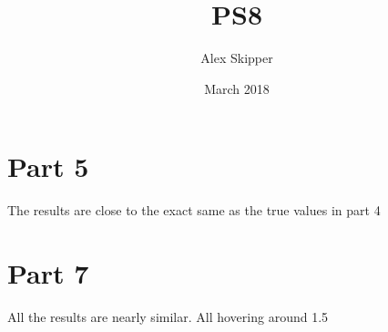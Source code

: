 \documentclass{article}
\title{PS8}
\author{Alex Skipper }
\date{March 2018}
\begin{document}
\maketitle

\section{Part 5}
The results are close to the exact same as the true values in part 4 

\begin{table}[!htbp] \centering 
  \caption{} 
  \label{} 
\end{table} 



\section{Part 7}
All the results are nearly similar. All hovering around 1.5 
\end{document}
